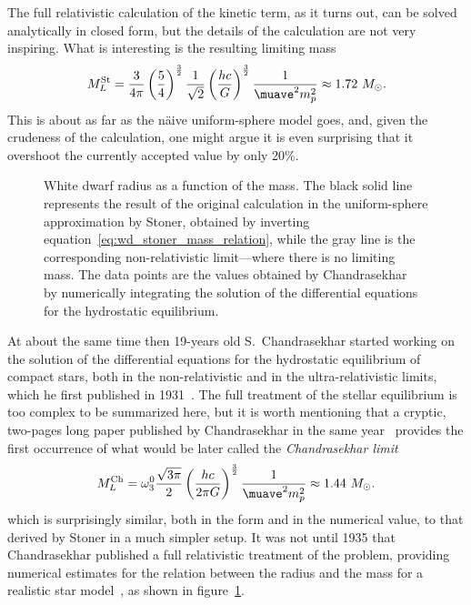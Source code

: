 The full relativistic calculation of the kinetic term, as it turns out, can be solved
analytically in closed form, but the details of the calculation are not very inspiring.
What is interesting is the resulting limiting mass
\begin{align}\label{eq:wd_mass_limit_stoner}
  M_{L}^\text{St} = \frac{3}{4\pi} \left( \frac{5}{4} \right)^\frac{3}{2} \frac{1}{\sqrt{2}}
  \left( \frac{hc}{G} \right)^\frac{3}{2} \frac{1}{\muave^2 m_p^2} \approx 1.72~M_\odot.
\end{align}
This is about as far as the n\"aive uniform-sphere model goes, and, given the
crudeness of the calculation, one might argue it is even surprising that it
overshoot the currently accepted value by only 20\%.

\begin{figure}[htbp!]
	
	\caption{White dwarf radius as a function of the mass. The black solid line
    represents the result of the original calculation in the uniform-sphere
    approximation by Stoner\cite{1930LEDPM...9..944S}, obtained by inverting
    equation~\eqref{eq:wd_stoner_mass_relation}, while the gray line is the
    corresponding non-relativistic limit---where there is no limiting mass.
    The data points are the values obtained by Chandrasekhar~\cite{1935MNRAS..95..207C}
    by numerically integrating the solution of the differential equations for
    the hydrostatic equilibrium.}
    \label{fig:wd_mass_radius}
\end{figure}

At about the same time then 19-years old S.~Chandrasekhar started working on the
solution of the differential equations for the hydrostatic equilibrium of compact
stars, both in the non-relativistic and in the ultra-relativistic limits, which
he first published in 1931~\cite{1931MNRAS..91..456C}. The full treatment of the
stellar equilibrium is too complex to be summarized here, but it is worth mentioning
that a cryptic, two-pages long paper published by Chandrasekhar in the same
year~\cite{1931ApJ....74...81C} provides the first occurrence of what would
be later called the \emph{Chandrasekhar limit}%
\begin{align}\label{eq:wd_mass_limit_chandra}
  M_{L}^\text{Ch} = \omega_3^0 \frac{\sqrt{3\pi}}{2}
  \left( \frac{hc}{2\pi G} \right)^\frac{3}{2} \frac{1}{\muave^2 m_p^2} \approx 1.44~M_\odot.
\end{align}
which is surprisingly similar, both in the form and in the numerical value, to
that derived by Stoner in a much simpler setup.
It was not until 1935 that Chandrasekhar published a full relativistic treatment
of the problem, providing numerical estimates for the relation between the radius
and the mass for a realistic star model~\cite{1935MNRAS..95..207C}, as shown in
figure~\ref{fig:wd_mass_radius}.

